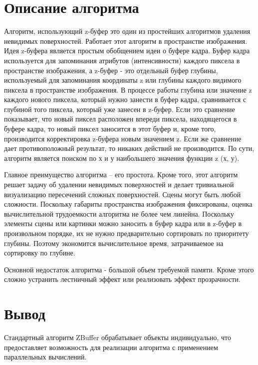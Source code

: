 \section{Описание алгоритма}
Алгоритм, использующий z-буфер это один из простейших алгоритмов удаления невидимых поверхностей. Работает этот алгоритм в пространстве изображения. Идея z-буфера является простым обобщением идеи о буфере кадра. Буфер кадра используется для запоминания атрибутов (интенсивности) каждого пиксела в пространстве изображения, а z-буфер - это отдельный буфер глубины, используемый для запоминания координаты z или глубины каждого видимого пиксела в пространстве изображения. В процессе работы глубина или значение z каждого нового пиксела, который нужно занести в буфер кадра, сравнивается с глубиной того пиксела, который уже занесен в z-буфер. Если это сравнение показывает, что новый пиксел расположен впереди пиксела, находящегося в буфере кадра, то новый пиксел заносится в этот буфер и, кроме того, производится корректировка z-буфера новым значением z. Если же сравнение дает противоположный результат, то никаких действий не производится. По сути, алгоритм является поиском по х и у наибольшего значения функции z (х, у). \cite{task}

Главное преимущество алгоритма – его простота. Кроме того, этот алгоритм решает задачу об удалении невидимых поверхностей и делает тривиальной визуализацию пересечений сложных поверхностей. Сцены могут быть любой сложности. Поскольку габариты пространства изображения фиксированы, оценка вычислительной трудоемкости алгоритма не более чем линейна. Поскольку элементы сцены или картинки можно заносить в буфер кадра или в z-буфер в произвольном порядке, их не нужно предварительно сортировать по приоритету глубины. Поэтому экономится вычислительное время, затрачиваемое на сортировку по глубине.

Основной недостаток алгоритма - большой объем требуемой памяти. Кроме этого сложно устранить лестничный эффект или реализовать эффект прозрачности.

\section{Вывод}

Стандартный алгоритм ZBuffer обрабатывает объекты индивидуально, что предоставляет возможность для реализации алгоритма с применением параллельных вычислений.
